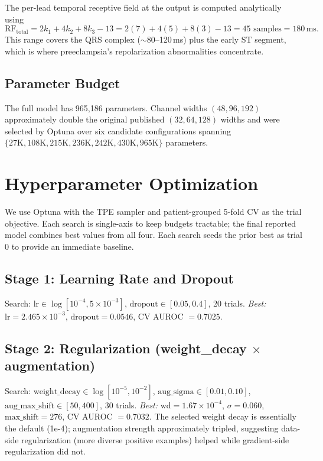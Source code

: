 \documentclass[11pt]{article}
\begin{document}
The per-lead temporal receptive field at the output is computed analytically using
\[
\text{RF}_\text{total} = 2k_1 + 4k_2 + 8k_3 - 13 = 2(7) + 4(5) + 8(3) - 13 = 45 \text{ samples} = 180\,\text{ms}.
\]
This range covers the QRS complex ($\sim$80--120\,ms) plus the early ST segment, which is where preeclampsia's repolarization abnormalities concentrate.

\subsection{Parameter Budget}

The full model has 965,186 parameters. Channel widths $(48, 96, 192)$ approximately double the original published $(32, 64, 128)$ widths and were selected by Optuna over six candidate configurations spanning $\{27\text{K}, 108\text{K}, 215\text{K}, 236\text{K}, 242\text{K}, 430\text{K}, 965\text{K}\}$ parameters.

\section{Hyperparameter Optimization}

We use Optuna with the TPE sampler and patient-grouped 5-fold CV as the trial objective. Each search is single-axis to keep budgets tractable; the final reported model combines best values from all four. Each search seeds the prior best as trial 0 to provide an immediate baseline.

\subsection{Stage 1: Learning Rate and Dropout}

Search: $\text{lr} \in \log[10^{-4}, 5 \times 10^{-3}]$, $\text{dropout} \in [0.05, 0.4]$, 20 trials. \emph{Best:} $\text{lr} = 2.465 \times 10^{-3}$, $\text{dropout} = 0.0546$, CV AUROC $= 0.7025$.

\subsection{Stage 2: Regularization (weight\_decay $\times$ augmentation)}\label{sec:reg-search}

Search: $\text{weight\_decay} \in \log[10^{-5}, 10^{-2}]$, $\text{aug\_sigma} \in [0.01, 0.10]$, $\text{aug\_max\_shift} \in [50, 400]$, 30 trials. \emph{Best:} $\text{wd} = 1.67 \times 10^{-4}$, $\sigma = 0.060$, $\text{max\_shift} = 276$, CV AUROC $= 0.7032$. The selected weight decay is essentially the default (1e-4); augmentation strength approximately tripled, suggesting data-side regularization (more diverse positive examples) helped while gradient-side regularization did not.
\end{document}

